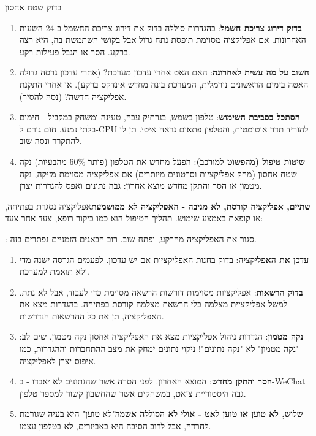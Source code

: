 


בדוק שטח אחסון


\begin{enumerate}
  \item \textbf{בדוק דירוג צריכת חשמל}: בהגדרות סוללה בדוק את דירוג צריכת החשמל ב-24 השעות האחרונות. אם אפליקציה מסוימת תופסת נתח גדול אבל בקושי השתמשת בה, היא רצה ברקע. הסר או הגבל פעילות רקע.
  \item \textbf{חשוב על מה עשית לאחרונה}: האם האט אחרי עדכון מערכת? (אחרי עדכון גרסה גדולה האטה בימים הראשונים נורמלית, המערכת בונה מחדש אינדקס ברקע). או אחרי התקנת אפליקציה חדשה? (נסה להסיר).
  \item \textbf{הסתכל בסביבת השימוש}: טלפון בשמש, בנרתיק עבה, טעינה ומשחק במקביל - חימום בלתי נמנע. חום גורם ל-CPU להוריד תדר אוטומטית, והטלפון פתאום נראה איטי. תן לו להתקרר ונסה שוב.
  \item \textbf{שיטות טיפול (מהפשוט למורכב)}: הפעל מחדש את הטלפון (פותר 60\% מהבעיות) נקה שטח אחסון (מחק אפליקציות וסרטונים מיותרים) אם אפליקציה מסוימת מזיקה, נקה מטמון או הסר והתקן מחדש מוצא אחרון: גבה נתונים ואפס להגדרות יצרן.
\end{enumerate}

\textbf{שתיים, אפליקציה קורסת, לא מגיבה - האפליקציה לא ממושמעת}אפליקציה נסגרת בפתיחה, או קופאת באמצע שימוש. תהליך הטיפול הוא כמו ביקור רופא, צעד אחר צעד:


: סגור את האפליקציה מהרקע, ופתח שוב. רוב הבאגים הזמניים נפתרים בזה.

\begin{enumerate}
  \item \textbf{עדכן את האפליקציה}: בדוק בחנות האפליקציות אם יש עדכון. לפעמים הגרסה ישנה מדי ולא תואמת למערכת.
  \item \textbf{בדוק הרשאות}: אפליקציות מסוימות דורשות הרשאה מסוימת כדי לעבוד, אבל לא נתת. למשל אפליקציית מצלמה בלי הרשאת מצלמה קורסת בפתיחה. בהגדרות מצא את האפליקציה, תן את כל ההרשאות הנדרשות.
  \item \textbf{נקה מטמון}: הגדרות ניהול אפליקציות מצא את האפליקציה אחסון נקה מטמון. שים לב: "נקה מטמון" לא "נקה נתונים"! ניקוי נתונים ימחק את מצב ההתחברות וההגדרות, כמו איפוס יצרן לאפליקציה.
  \item \textbf{הסר והתקן מחדש}: המוצא האחרון. לפני הסרה אשר שהנתונים לא יאבדו - ב-WeChat גבה היסטוריית צ'אט, במשחקים אשר שהחשבון קשור למספר טלפון.
  \item \textbf{שלוש, לא טוען או טוען לאט - אולי לא הסוללה אשמה}"לא טוען" היא בעיה שגורמת לחרדה, אבל לרוב הסיבה היא באביזרים, לא בטלפון עצמו.
\end{enumerate}

